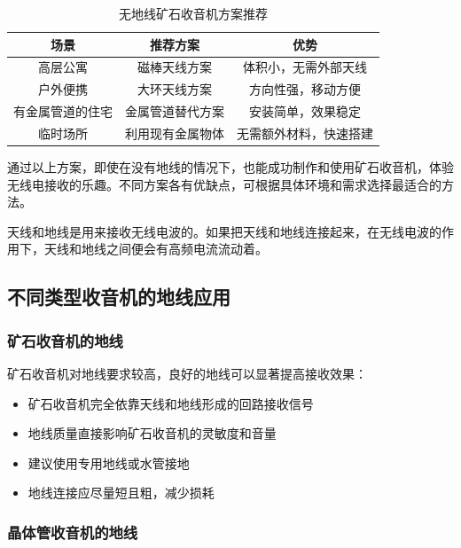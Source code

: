 \documentclass[12pt,UTF8]{ctexbook}
\begin{document}
\begin{table}[htbp]
    \centering
    \begin{tabular}{|c|c|c|}
        \hline
        \textbf{场景} & \textbf{推荐方案} & \textbf{优势} \\
        \hline
        高层公寓 & 磁棒天线方案 & 体积小，无需外部天线 \\
        \hline
        户外便携 & 大环天线方案 & 方向性强，移动方便 \\
        \hline
        有金属管道的住宅 & 金属管道替代方案 & 安装简单，效果稳定 \\
        \hline
        临时场所 & 利用现有金属物体 & 无需额外材料，快速搭建 \\
        \hline
    \end{tabular}
    \caption{无地线矿石收音机方案推荐}
    \label{tab:groundless_radio}
\end{table}

通过以上方案，即使在没有地线的情况下，也能成功制作和使用矿石收音机，体验无线电接收的乐趣。不同方案各有优缺点，可根据具体环境和需求选择最适合的方法。

天线和地线是用来接收无线电波的。如果把天线和地线连接起来，在无线电波的作用下，天线和地线之间便会有高频电流流动着。

\subsection{不同类型收音机的地线应用}

\subsubsection{矿石收音机的地线}

矿石收音机对地线要求较高，良好的地线可以显著提高接收效果：

\begin{itemize}[leftmargin=3.5em]
    \item 矿石收音机完全依靠天线和地线形成的回路接收信号
    \item 地线质量直接影响矿石收音机的灵敏度和音量
    \item 建议使用专用地线或水管接地
    \item 地线连接应尽量短且粗，减少损耗
\end{itemize}

\subsubsection{晶体管收音机的地线}
\end{document}
